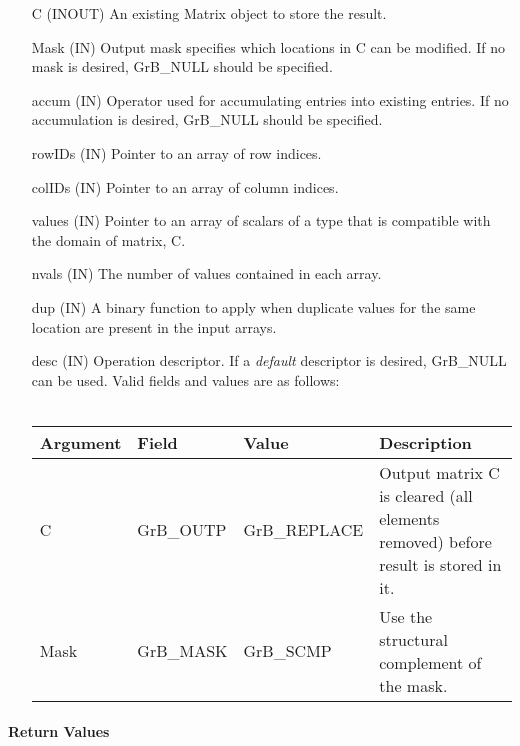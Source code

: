 \begin{itemize}[leftmargin=1.1in]
    \item[{\sf C}]      ({\sf INOUT}) An existing Matrix object to store the result.
    \item[{\sf Mask}]   (IN) Output mask specifies which locations in
                        {\sf C} can be modified.  If no mask is desired,
                        {\sf GrB\_NULL} should be specified.
    \item[{\sf accum}]  ({\sf IN}) Operator used for accumulating entries into 
                        existing  entries. If no accumulation is desired,
                        {\sf GrB\_NULL} should be specified.
    \item[{\sf rowIDs}] ({\sf IN}) Pointer to an array of row indices. 
    \item[{\sf colIDs}] ({\sf IN}) Pointer to an array of column indices. 
    \item[{\sf values}] ({\sf IN}) Pointer to an array of scalars of a type that
                                   is compatible with the domain of matrix, {\sf C}.
    \item[{\sf nvals}]  ({\sf IN}) The number of values contained in each array.
    \item[{\sf dup}]    ({\sf IN}) A binary function to apply when duplicate values 
                        for the same location are present in the input arrays.
    \item[{\sf desc}]   ({\sf IN}) Operation descriptor. If a
                        \emph{default} descriptor is desired, {\sf GrB\_NULL} can be
                        used.  Valid fields and values are as follows: \\ ~\\
    \begin{tabular}{lllp{2.5in}}
    Argument & Field  & Value & Description \\
    \hline
    {\sf C}    & {\sf GrB\_OUTP} & {\sf GrB\_REPLACE}& Output matrix {\sf C} is cleared (all elements removed) before result is stored in it. \\
    {\sf Mask} & {\sf GrB\_MASK} & {\sf GrB\_SCMP}   & Use the structural complement of the mask. \\
    \end{tabular}
\end{itemize}

\paragraph{Return Values}

